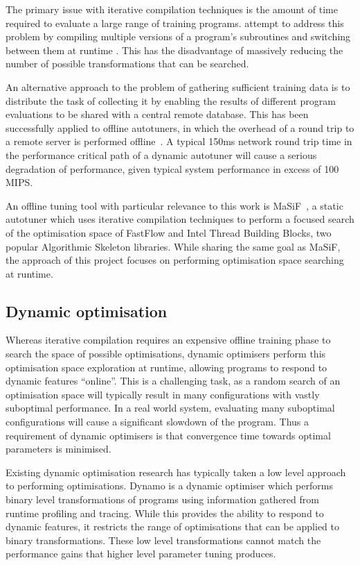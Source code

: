 The primary issue with iterative compilation techniques is the amount
of time required to evaluate a large range of training
programs. \citeauthor{Fursin2005} attempt to address this problem by
compiling multiple versions of a program's subroutines and switching
between them at runtime \cite{Fursin2005}. This has the disadvantage
of massively reducing the number of possible transformations that can
be searched.

An alternative approach to the problem of gathering sufficient
training data is to distribute the task of collecting it by enabling
the results of different program evaluations to be shared with a
central remote database. This has been successfully applied to offline
autotuners, in which the overhead of a round trip to a remote server
is performed offline~\cite{Fursin2010, Auler2014}. A typical 150ms
network round trip time in the performance critical path of a dynamic
autotuner will cause a serious degradation of performance, given
typical system performance in excess of 100 MIPS.

An offline tuning tool with particular relevance to this work is
MaSiF~\cite{Collins2013}, a static autotuner which uses iterative
compilation techniques to perform a focused search of the optimisation
space of FastFlow and Intel Thread Building Blocks, two popular
Algorithmic Skeleton libraries. While sharing the same goal as MaSiF,
the approach of this project focuses on performing optimisation space
searching at runtime.

\subsection{Dynamic optimisation}\label{subsec:dynamic-optimisation}
Whereas iterative compilation requires an expensive offline training
phase to search the space of possible optimisations, dynamic
optimisers perform this optimisation space exploration at runtime,
allowing programs to respond to dynamic features ``online''. This is a
challenging task, as a random search of an optimisation space will
typically result in many configurations with vastly suboptimal
performance. In a real world system, evaluating many suboptimal
configurations will cause a significant slowdown of the program. Thus
a requirement of dynamic optimisers is that convergence time towards
optimal parameters is minimised.

Existing dynamic optimisation research has typically taken a low level
approach to performing optimisations. Dynamo is a dynamic optimiser
which performs binary level transformations of programs using
information gathered from runtime profiling and tracing. While this
provides the ability to respond to dynamic features, it restricts the
range of optimisations that can be applied to binary
transformations. These low level transformations cannot match the
performance gains that higher level parameter tuning produces.

